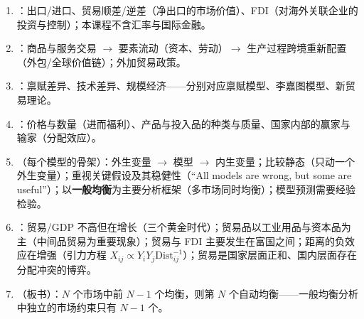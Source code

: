 \begin{sumbox}
\begin{enumerate}
  \item {}：出口/进口、贸易顺差/逆差（净出口的市场价值）、FDI（对海外关联企业的投资与控制）；本课程不含汇率与国际金融。
  \item {}：商品与服务交易 $\to$ 要素流动（资本、劳动）$\to$ 生产过程跨境重新配置（外包/全球价值链）；外加贸易政策。
  \item {}：禀赋差异、技术差异、规模经济——分别对应禀赋模型、李嘉图模型、新贸易理论。
  \item {}：价格与数量（进而福利）、产品与投入品的种类与质量、国家内部的赢家与输家（分配效应）。
  \item {}（每个模型的骨架）：外生变量 $\to$ 模型 $\to$ 内生变量；比较静态（只动一个外生变量）；重视关键假设及其稳健性（``All models are wrong, but some are useful''）；以\textbf{一般均衡}为主要分析框架（多市场同时均衡）；模型预测需要经验检验。
  \item {}：贸易/GDP 不高但在增长（三个黄金时代）；贸易品以工业用品与资本品为主（中间品贸易为重要现象）；贸易与 FDI 主要发生在富国之间；距离的负效应在增强（引力方程 $X_{ij} \propto Y_i Y_j \mathrm{Dist}_{ij}^{-1}$）；贸易是国家层面正和、国内层面存在分配冲突的博弈。
  \item {}（板书）：$N$ 个市场中前 $N-1$ 个均衡，则第 $N$ 个自动均衡——一般均衡分析中独立的市场约束只有 $N-1$ 个。
\end{enumerate}
\end{sumbox}
